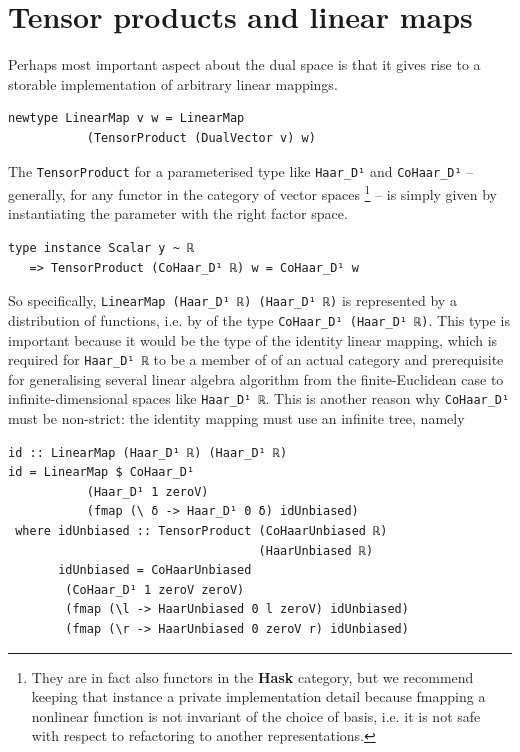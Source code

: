 \documentclass[sigplan,review,anonymous]{acmart}\settopmatter{printfolios=true,printccs=false,printacmref=false}
\theoremstyle{acmplain}
\theoremstyle{acmdefinition}
\begin{document}
\section{Tensor products and linear maps}
Perhaps most important aspect about the dual space is that it gives rise to a storable implementation of arbitrary linear mappings.
\begin{lstlisting}
newtype LinearMap v w = LinearMap
           (TensorProduct (DualVector v) w)
\end{lstlisting}
The \lstinline`TensorProduct` for a parameterised type like \lstinline`Haar_D¹` and \lstinline`CoHaar_D¹` -- generally, for any functor in the category of vector spaces%
\footnote{They are in fact also functors in the \textbf{Hask} category, but we recommend keeping that instance a private implementation detail because fmapping a nonlinear function is not invariant of the choice of basis, i.e. it is not safe with respect to refactoring to another representations.
} -- is simply given by instantiating the parameter with the right factor space.
\begin{lstlisting}
type instance Scalar y ~ ℝ
   => TensorProduct (CoHaar_D¹ ℝ) w = CoHaar_D¹ w
\end{lstlisting}
So specifically, \lstinline`LinearMap (Haar_D¹ ℝ) (Haar_D¹ ℝ)` is represented by a distribution of functions, i.e. by of the type \lstinline`CoHaar_D¹ (Haar_D¹ ℝ)`.
This type is important because it would be the type of the identity linear mapping, which is required for \lstinline`Haar_D¹ ℝ` to be a member of of an actual category and prerequisite for generalising several linear algebra algorithm from the finite-Euclidean case to infinite-dimensional spaces like \lstinline`Haar_D¹ ℝ`.
This is another reason why \lstinline`CoHaar_D¹` must be non-strict: the identity mapping must use an infinite tree, namely
\begin{lstlisting}
id :: LinearMap (Haar_D¹ ℝ) (Haar_D¹ ℝ)
id = LinearMap $ CoHaar_D¹
           (Haar_D¹ 1 zeroV)
           (fmap (\ δ -> Haar_D¹ 0 δ) idUnbiased)
 where idUnbiased :: TensorProduct (CoHaarUnbiased ℝ)
                                   (HaarUnbiased ℝ)
       idUnbiased = CoHaarUnbiased
        (CoHaar_D¹ 1 zeroV zeroV)
        (fmap (\l -> HaarUnbiased 0 l zeroV) idUnbiased)
        (fmap (\r -> HaarUnbiased 0 zeroV r) idUnbiased)
\end{lstlisting}
\end{document}
